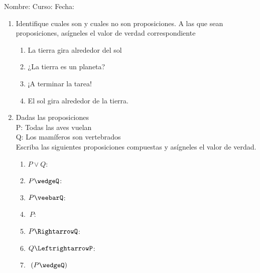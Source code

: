 \documentclass[letterpaper,fleqn]{article}
\newcommand{\LineaNombre}{%
\par
\vspace{\baselineskip}
Nombre:\hrulefill \; Curso: \underline{\hspace*{48pt}} \; Fecha: \underline{\hspace*{2.5cm}} \relax
\par}
\begin{document}
\LineaNombre
\begin{enumerate}
 \item Identifique cuales son y cuales no son proposiciones. A las que sean proposiciones, as\'{i}gneles el valor de verdad correspondiente
 \begin{enumerate}
 \item La tierra gira alrededor del sol
 \item ¿La tierra es un planeta?
 \item ¡A terminar la tarea!
 \item El sol gira alrededor de la tierra.
 \end{enumerate}
 \item Dadas las proposiciones\\
 P: Todas las aves vuelan\\
 Q: Los mamíferos son vertebrados\\
Escriba las siguientes proposiciones compuestas y asígneles el valor de verdad.
\begin{enumerate}
\item $P\vee Q$:
\item $P\wedgeQ$:
\item $P\veebarQ$:
\item $~P$:
\item $P\RightarrowQ$:
\item $Q\LeftrightarrowP$:
\item $~(P\wedgeQ)$
\end{enumerate}
 \end{enumerate}
\end{document}
